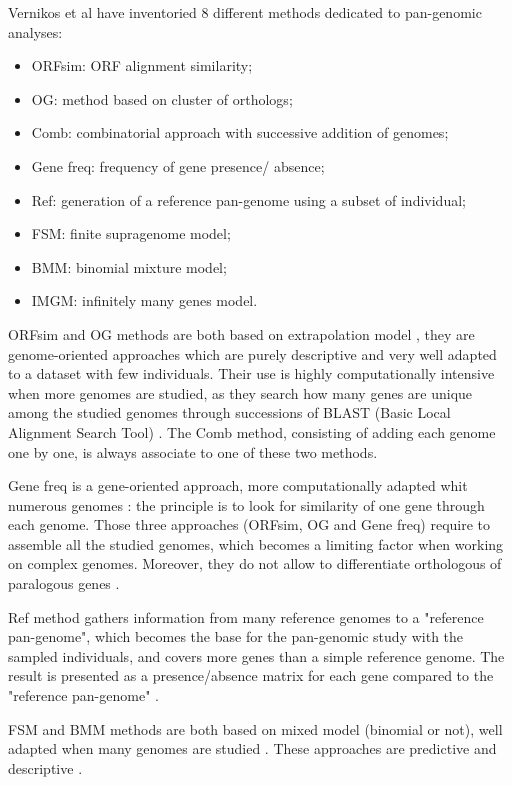 \documentclass[a4paper,10pt,twoside]{report}
\begin{document}
Vernikos et al \cite{Vernikos2015} have inventoried 8 different methods dedicated to pan-genomic analyses:
\begin{itemize}
\item ORFsim: ORF alignment similarity;
\item OG: method based on cluster of orthologs;
\item Comb: combinatorial approach with successive addition of genomes;
\item Gene freq: frequency of gene presence/ absence;
\item Ref: generation of a reference pan-genome using a subset of individual;
\item FSM: finite supragenome model;
\item BMM: binomial mixture model;
\item IMGM: infinitely many genes model.\\
\end{itemize}

ORFsim and OG methods are both based on extrapolation model \cite{Baumdicker2012}, they are genome-oriented approaches \cite{Lapierre2009} which are purely descriptive and very well adapted to a dataset with few individuals. Their use is highly computationally intensive when more genomes are studied, as they search how many genes are unique among the studied genomes through successions of BLAST (Basic Local Alignment Search Tool) \cite{Lapierre2009}. The Comb method, consisting of adding each genome one by one, is always associate to one of these two methods.

Gene freq is a gene-oriented approach, more computationally adapted whit numerous genomes \cite{Lapierre2009}: the principle is to look for similarity of one gene through each genome. Those three approaches (ORFsim, OG and Gene freq) require to assemble all the studied genomes, which becomes a limiting factor when working on complex genomes. Moreover, they do not allow to differentiate orthologous of paralogous genes \cite{Lapierre2009}.

Ref method gathers information from many reference genomes to a "reference pan-genome", which becomes the base for the pan-genomic study with the sampled individuals, and covers more genes than a simple reference genome. The result is presented as a presence/absence matrix for each gene compared to the "reference pan-genome" \cite{Meric2014}.

FSM and BMM methods are both based on mixed model (binomial or not), well adapted when many genomes are studied \cite{Snipen2010}. These approaches are predictive and descriptive \cite{Boissy2011}. 
\end{document}
